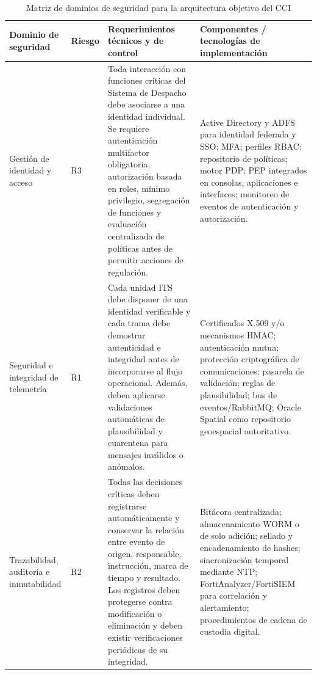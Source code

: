 \begin{table}[H]
	\centering
	\caption{Matriz de dominios de seguridad para la arquitectura objetivo del CCI}
	\label{tab:matriz_dominios_seguridad}
	\scriptsize
	\begin{tabularx}{\textwidth}{
			>{\raggedright\arraybackslash}p{2.35cm}
			>{\raggedright\arraybackslash}p{1.15cm}
			>{\raggedright\arraybackslash}X
			>{\raggedright\arraybackslash}X}
		\toprule
		\textbf{Dominio de seguridad} &
		\textbf{Riesgo} &
		\textbf{Requerimientos técnicos y de control} &
		\textbf{Componentes / tecnologías de implementación} \\
		\midrule
		
		Gestión de identidad y acceso &
		R3 &
		Toda interacción con funciones críticas del Sistema de Despacho debe asociarse a una identidad
		individual. Se requiere autenticación multifactor obligatoria, autorización basada en roles,
		mínimo privilegio, segregación de funciones y evaluación centralizada de políticas antes de
		permitir acciones de regulación. &
		Active Directory y ADFS para identidad federada y SSO; MFA; perfiles RBAC; repositorio de
		políticas; motor PDP; PEP integrados en consolas, aplicaciones e interfaces; monitoreo de
		eventos de autenticación y autorización. \\
		
		\addlinespace
		
		Seguridad e integridad de telemetría &
		R1 &
		Cada unidad ITS debe disponer de una identidad verificable y cada trama debe demostrar
		autenticidad e integridad antes de incorporarse al flujo operacional. Además, deben aplicarse
		validaciones automáticas de plausibilidad y cuarentena para mensajes inválidos o anómalos. &
		Certificados X.509 y/o mecanismos HMAC; autenticación mutua; protección criptográfica de
		comunicaciones; pasarela de validación; reglas de plausibilidad; bus de eventos/RabbitMQ;
		Oracle Spatial como repositorio geoespacial autoritativo. \\
		
		\addlinespace
		
		Trazabilidad, auditoría e inmutabilidad &
		R2 &
		Todas las decisiones críticas deben registrarse automáticamente y conservar la relación entre
		evento de origen, responsable, instrucción, marca de tiempo y resultado. Los registros deben
		protegerse contra modificación o eliminación y deben existir verificaciones periódicas de su
		integridad. &
		Bitácora centralizada; almacenamiento WORM o de solo adición; sellado y encadenamiento de
		hashes; sincronización temporal mediante NTP; FortiAnalyzer/FortiSIEM para correlación y
		alertamiento; procedimientos de cadena de custodia digital. \\
		

\end{tabularx}
\end{table}

